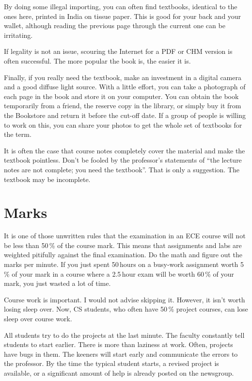 \documentclass{book}
\begin{document}
By doing some illegal importing, you can often find textbooks, identical to the ones here, printed in India on tissue paper. This is good for your back and your wallet, although reading the previous page through the current one can be irritating.

If legality is not an issue, scouring the Internet for a PDF or CHM version is often successful. The more popular the book is, the easier it is.

Finally, if you really need the textbook, make an investment in a digital camera and a good diffuse light source. With a little effort, you can take a photograph of each page in the book and store it on your computer. You can obtain the book temporarily from a friend, the reserve copy in the library, or simply buy it from the Bookstore and return it before the cut-off date. If a group of people is willing to work on this, you can share your photos to get the whole set of textbooks for the term.

It is often the case that course notes completely cover the material and make the textbook pointless. Don't be fooled by the professor's statements of ``the lecture notes are not complete; you need the textbook''. That is only a suggestion. The textbook may be incomplete.

\section{Marks}
It is one of those unwritten rules that the examination in an ECE course will not be less than 50\,\% of the course mark. This means that assignments and labs are weighted pitifully against the final examination. Do the math and figure out the marks per minute. If you just spent 50\,hours on a busy-work assignment worth 5\,\% of your mark in a course where a 2.5\,hour exam will be worth 60\,\% of your mark, you just wasted a lot of time.

Course work is important. I would not advise skipping it. However, it isn't worth losing sleep over. Now, CS students, who often have 50\,\% project courses, can lose sleep over course work.

All students try to do the projects at the last minute. The faculty constantly tell students to start earlier. There is more than laziness at work. Often, projects have bugs in them. The keeners will start early and communicate the errors to the professor. By the time the typical student starts, a revised project is available, or a significant amount of help is already posted on the newsgroup.
\end{document}
